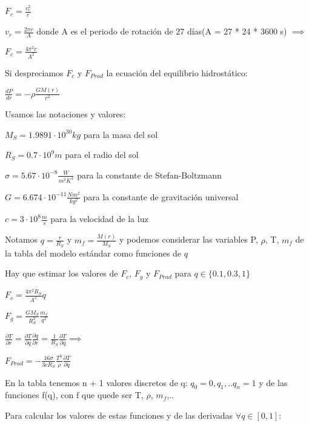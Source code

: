 \documentclass[10pt]{book}
\begin{document}
$F_c = \frac {v_r^2}{r}$

$v_r = \frac{2 \pi r}{A} $ donde A es el periodo de rotación de 27 días(A = 27 * 24 * 3600 s) $\implies$

$F_c = \frac {4 \pi^2 r}{A^2}$

Si despreciamos $F_c$ y  $F_{Prad}$ la ecuación del equilibrio hidrostático:

$ \frac{d P}{d r} = -\rho \frac{G M(r)}{r^2}$

Usamos las notaciones y valores:
\begin{description}
\item $M_S = 1.9891 \cdot 10^{30} kg$ para la masa del sol
\item $R_S = 0.7 \cdot 10^9 m$ para el radio del sol
\item $\sigma = 5.67 \cdot 10^{-8} \frac{W}{m^2 K^4}$ para la constante de Stefan-Boltzmann
\item $G = 6.674 \cdot 10^{-11} \frac{N m^2}{kg^2}$ para la constante de gravitación universal
\item $c = 3 \cdot 10^{8} \frac{m}{s}$ para la velocidad de la luz

\end{description}

Notamos $q = \frac{r}{R_S}$ y $m_f = \frac{M(r)}{M_S}$ 
y podemos considerar las variables P, $\rho$, T, $m_f$ de la tabla del modelo estándar como funciones de $q$

Hay que estimar los valores de $F_c$, $F_g$ y $F_{Prad}$ para  $q \in \{0.1, 0.3, 1\}$

$F_c = \frac {4 \pi^2 R_S}{A^2} q$
 

$F_g = \frac {G M_S}{R_S^2} \frac{m_f}{q^2} $

$\frac {\partial T}{\partial r} = \frac {\partial T}{\partial q}   \frac {\partial q}{\partial r} =  \frac {1}{R_S}  \frac {\partial T}{\partial q} \implies $

$F_{Prad} = -\frac {16 \sigma}{3 c R_S} \frac {T^3}{\rho} \frac {\partial T}{\partial q}$

En la tabla tenemos n + 1 valores discretos de q: $q_0=0, q_1, .. q_n = 1$
y de las funciones f(q), con f que quede ser T, $\rho$, $m_f$,.. 
 
Para calcular los valores de estas funciones y de las derivadas $\forall q \in [0,1]$:
\end{document}
